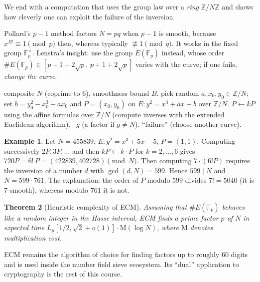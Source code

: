 \documentclass[11pt,a4paper,oneside]{book}
\theoremstyle{plain}
\newtheorem{theorem}{Theorem}[chapter]
\theoremstyle{definition}
\newtheorem{example}[theorem]{Example}
\theoremstyle{remark}
\newcommand{\Z}{\mathbb{Z}}
\newcommand{\F}{\mathbb{F}}
\begin{document}
We end with a computation that uses the group law over a \emph{ring} $\Z/N\Z$ and shows how cleverly one can exploit the failure of the inversion.

Pollard's $p-1$ method factors $N=pq$ when $p-1$ is smooth, because $x^{B!}\equiv1\pmod p$ then, whereas typically $\not\equiv1\pmod q$. It works in the fixed group $\F_p^\times$.
Lenstra's insight: use the group $E(\F_p)$ instead, whose order $\#E(\F_p)\in[p+1-2\sqrt p,\,p+1+2\sqrt p]$ varies with the curve; if one fails, \emph{change the curve}.

\begin{algorithm}[ht]
\caption{Elliptic Curve Method (one curve)}\label{alg:ECM}
\begin{algorithmic}[1]
\Require composite $N$ (coprime to $6$), smoothness bound $B$.
\State pick random $a,x_0,y_0\in\Z/N$; set $b=y_0^2-x_0^3-ax_0$ and $P=(x_0,y_0)$ on $E:y^2=x^3+ax+b$ over $\Z/N$.
  \State $P\gets kP$ using the affine formulas over $\Z/N$ (compute inverses with the extended Euclidean algorithm).
  \ \Return $g$ (a factor if $g\neq N$).\EndIf
\EndFor
\State \Return ``failure'' (choose another curve).
\end{algorithmic}
\end{algorithm}

\begin{example}\label{ex:ecm}
Let $N=455839$, $E:y^2=x^3+5x-5$, $P=(1,1)$. Computing successively $2P,3P,\dots$ and then $kP\leftarrow k\cdot P$ for $k=2,\dots,6$ gives $720P=6!\,P=(422839,402728)\pmod N$.
Then computing $7\cdot(6!P)$ requires the inversion of a number $d$ with $\gcd(d,N)=599$. Hence $599\mid N$ and $N=599\cdot761$.
The explanation: the order of $P$ modulo $599$ divides $7!=5040$ (it is $7$-smooth), whereas modulo $761$ it is not.
\end{example}

\begin{theorem}[Heuristic complexity of ECM]
Assuming that $\#E(\F_p)$ behaves like a random integer in the Hasse interval, ECM finds a prime factor $p$ of $N$ in expected time $L_p[1/2,\sqrt2+o(1)]\cdot\mathrm{M}(\log N)$, where $\mathrm M$ denotes multiplication cost.
\end{theorem}

ECM remains the algorithm of choice for finding factors up to roughly $60$ digits and is used inside the number field sieve ecosystem. Its ``dual'' application to cryptography is the rest of this course.
\end{document}
